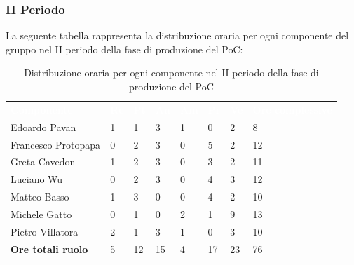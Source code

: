 \subsubsection{II Periodo}
La seguente tabella rappresenta la distribuzione oraria per ogni componente del gruppo nel II periodo della fase di produzione del PoC:
\begin{table}[H]
\begin{center}
\renewcommand{\arraystretch}{1.25}
\begin{tabular}{ m{}<{\centering}  m{}<{\centering} m{}<{\centering} m{}<{\centering}  m{}<{\centering}  m{}<{\centering}  m{}<{\centering}  m{}<{\centering}   }
	\rowcolor{darkblue}
	\textcolor{white}{\textbf{Componente}} &\textcolor{white}{\textbf{Re}}&\textcolor{white}{\textbf{Pt}}&\textcolor{white}{\textbf{An}}&\textcolor{white}{\textbf{Am}}&\textcolor{white}{\textbf{Pr}}&\textcolor{white}{\textbf{Ve}}&\textcolor{white}{\textbf{Ore complessive}}\\ 
	Edoardo Pavan & 1 & 1 & 3 & 1 & 0 & 2 & 8 \\	
	
	Francesco Protopapa & 0 & 2 & 3 & 0 & 5 & 2 & 12 \\

	Greta Cavedon & 1 & 2 & 3 & 0 & 3 & 2 & 11 \\
	
	Luciano Wu & 0 & 2 & 3 & 0 & 4 & 3 & 12\\
	
	Matteo Basso & 1 & 3 & 0 & 0 & 4 & 2 & 10 \\
	
	Michele Gatto &  0 & 1 & 0 & 2 & 1 & 9 & 13\\
	
	Pietro Villatora & 2 & 1 & 3 & 1 & 0 & 3 & 10 \\
	
	\textbf{Ore totali ruolo} & 5 & 12 & 15 & 4 & 17 & 23 & 76\\

\end{tabular}
\caption{Distribuzione oraria per ogni componente nel II periodo della fase di produzione del PoC}
\end{center}
\end{table}

